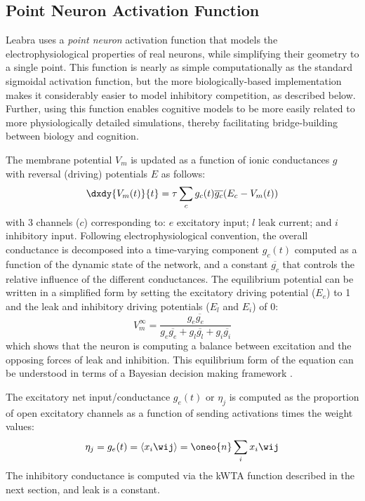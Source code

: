 \documentclass[12pt,twoside]{article}
\begin{document}
\subsection{Point Neuron Activation Function} 

Leabra uses a {\em point neuron} activation function that models the
electrophysiological properties of real neurons, while simplifying
their geometry to a single point.  This function is nearly as simple
computationally as the standard sigmoidal activation function, but the
more biologically-based implementation makes it considerably easier to
model inhibitory competition, as described below.  Further, using this
function enables cognitive models to be more easily related to more
physiologically detailed simulations, thereby facilitating
bridge-building between biology and cognition.

The membrane potential $V_m$ is updated as a function of ionic
conductances $g$ with reversal (driving) potentials $E$ as follows:
\begin{equation}
  \dxdy{V_m(t)}{t} = \tau \sum_c g_c(t) \overline{g_c} (E_c - V_m(t))
  \label{eq.vm}
\end{equation}
with 3 channels ($c$) corresponding to: $e$ excitatory input; $l$ leak
current; and $i$ inhibitory input.  Following electrophysiological
convention, the overall conductance is decomposed into a time-varying
component $g_c(t)$ computed as a function of the dynamic state of the
network, and a constant $\overline{g_c}$ that controls the relative
influence of the different conductances.  The equilibrium potential
can be written in a simplified form by setting the excitatory driving
potential ($E_e$) to 1 and the leak and inhibitory driving potentials
($E_l$ and $E_i$) of 0:
\begin{equation}
  V_m^\infty = \frac{g_e \overline{g_e}} {g_e
   \overline{g_e} + g_l \overline{g_l} + g_i \overline{g_i}}  
\end{equation}
which shows that the neuron is computing a balance between excitation
and the opposing forces of leak and inhibition.  This equilibrium form
of the equation can be understood in terms of a Bayesian decision
making framework \cite{OReillyMunakata00}.

The excitatory net input/conductance $g_e(t)$ or $\eta_j$ is computed
as the proportion of open excitatory channels as a function of sending
activations times the weight values:
\begin{equation}
  \eta_j = g_e(t) = \langle x_i \wij \rangle = \oneo{n} \sum_i x_i \wij
  \label{eq.net_in_avg}
\end{equation}
The inhibitory conductance is computed via the kWTA function described
in the next section, and leak is a constant.
\end{document}
